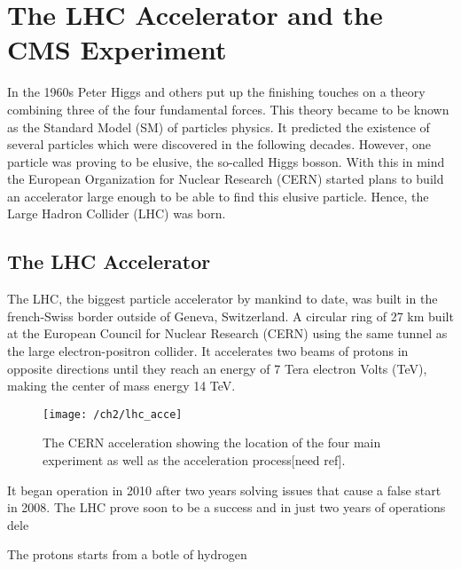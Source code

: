 
\chapter{The LHC Accelerator and the CMS Experiment}\label{ch:lhcandcms}
In the 1960s Peter Higgs and others {\color{red}} put up the finishing touches on a theory combining three of the four fundamental forces. This theory became to be known as the Standard Model (SM) of particles physics. It predicted the existence of several particles which were discovered in the following decades. However, one particle was proving to be elusive, the so-called Higgs bosson. With this in mind the European Organization for Nuclear Research (CERN) started plans to build an accelerator large enough to be able to find this elusive particle. Hence, the Large Hadron Collider (LHC) was born. 

\section{The LHC Accelerator}
The LHC, the biggest particle accelerator {} by mankind to date, was built in the french-Swiss border outside of Geneva, Switzerland. A circular ring of 27 km built at the European Council for Nuclear Research (CERN) using the same tunnel as the large electron-positron collider. It accelerates two beams of protons in opposite directions until they reach an energy of 7 Tera electron Volts (TeV), making the center of mass energy 14 TeV. 
 

\begin{figure}[!h]
	\centering
	\texttt{[image: /ch2/lhc\_acce]}
	\caption[The CERN acceleration ]{The CERN acceleration  showing the location of the four main experiment as well as the acceleration process[need ref].}
	\label{fig:cern}
\end{figure}

It began operation in 2010 after two years solving issues that cause a false start in 2008. The LHC prove soon to be a success and in just two years of operations dele  



The protons starts from a botle of hydrogen 


